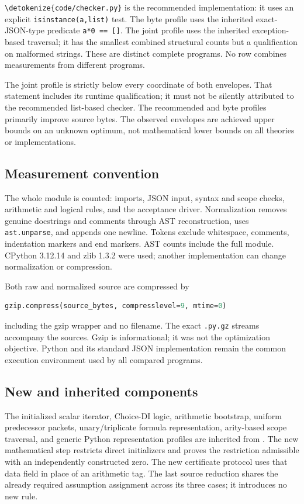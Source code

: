 \documentclass[11pt,letterpaper]{article}
\theoremstyle{definition}\newtheorem{definition}[theorem]{Definition}
\theoremstyle{remark}\newtheorem{remark}[theorem]{Remark}
\newcommand{\file}[1]{\expandafter\nolinkurl\expandafter{\detokenize{#1}}}
\begin{document}


\file{code/checker.py} is the recommended implementation: it uses an
explicit \texttt{isinstance(a,list)} test. The byte profile uses the
inherited exact-JSON-type predicate \texttt{a*0 == []}. The joint profile
uses the inherited exception-based traversal; it has the smallest
combined structural counts but a qualification on malformed strings.
These are distinct complete programs. No row combines measurements
from different programs.

The joint profile is strictly below every coordinate of both envelopes.
That statement includes its runtime qualification; it must not be
silently attributed to the recommended list-based checker. The
recommended and byte profiles primarily improve source bytes. The
observed envelopes are achieved upper bounds on an unknown optimum,
not mathematical lower bounds on all theories or implementations.

\subsection{Measurement convention}

The whole module is counted: imports, JSON input, syntax and scope
checks, arithmetic and logical rules, and the acceptance driver.
Normalization removes genuine docstrings and comments through AST
reconstruction, uses \texttt{ast.unparse}, and appends one newline.
Tokens exclude whitespace, comments, indentation markers and end markers.
AST counts include the full module. CPython 3.12.14 and zlib 1.3.2 were
used; another implementation can change normalization or compression.

Both raw and normalized source are compressed by
\begin{lstlisting}[language=Python]
gzip.compress(source_bytes, compresslevel=9, mtime=0)
\end{lstlisting}
including the gzip wrapper and no filename. The exact \texttt{.py.gz}
streams accompany the sources. Gzip is informational; it was not the
optimization objective. Python and its standard JSON implementation
remain the common execution environment used by all compared programs.

\subsection{New and inherited components}

The initialized scalar iterator, Choice-DI logic, arithmetic bootstrap,
uniform predecessor packets, unary/triplicate formula representation,
arity-based scope traversal, and generic Python representation profiles
are inherited from \cite{arity,uniform,constructed,generated,transient}.
The new mathematical step restricts direct initializers and proves the
restriction admissible with an independently constructed zero. The new
certificate protocol uses that data field in place of an arithmetic tag.
The last source reduction shares the already required assumption
assignment across its three cases; it introduces no new rule.
\end{document}

